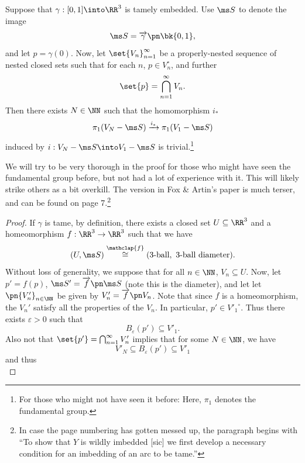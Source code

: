 \begin{example}
  \begin{theorem} \label{thm:fox-artin-tameness}
    Suppose that $\gamma : [0,1] \into \RR^3$ is tamely embedded. Use
    $\ms S$ to denote the image
    \[
      \ms S = \fim{\gamma}{\bk{0,1}},
    \]
    and let $p = \gamma(0)$. Now, let $\set{V_n}_{n =1}^\infty$ be a
    properly-nested sequence of nested closed sets such that for each
    $n$, $p \in V_n^\circ$, and further
    \[
      \set{p} = \bigcap_{n=1}^\infty V_n.%
    \]
    Then there exists $N \in \NN$ such that the homomorphism $i_*$
    \[
      \pi_1(V_N - \ms S) \xrightarrow{i_*} \pi_1(V_1 - \ms S)
    \]
    induced by $i : V_N - \ms S \into V_1 - \ms S$ is
    trivial.\footnote{For those who might not have seen it before:
      Here, $\pi_1$ denotes the fundamental group.}
  \end{theorem}
  We will try to be very thorough in the proof for those who might
  have seen the fundamental group before, but not had a lot of
  experience with it. This will likely strike others as a bit
  overkill. The version in Fox \& Artin's paper is much terser, and
  can be found on page 7.\footnote{In case the page numbering has
    gotten messed up, the paragraph begins with ``To show that $Y$ is
    wildly imbedded [sic] we first develop a necessary condition for
    an imbedding of an arc to be tame.''}
  \begin{proof}
    If $\gamma$ is tame, by definition, there exists a closed set $U
    \subseteq \RR^3$ and a homeomorphism $f : \RR^3 \to \RR^3$ such
    that we have
    \[
      (U, \ms S) \stackrel{\mathclap{f}}{\cong} (\text{3-ball},\
      \text{3-ball diameter}).
    \]
    Without loss of generality, we suppose that for all $n \in \NN$,
    $V_n \subseteq U$. Now, let $p' = f(p)$, $\ms S' = \fim{f}{\ms S}$
    (note this is the diameter), and let let $\pn{V_n'}_{n \in \NN}$
    be given by $V_n' = \fim{f}{V_n}$. Note that since $f$ is a
    homeomorphism, the $V_n'$ satisfy all the properties of the $V_n$.
    In particular, $p' \in {V'_1}^\circ$. Thus there exists
    $\varepsilon > 0$ such that
    \[
      B_\varepsilon(p') \subseteq V'_1.
    \]
    Also not that $\set{p'} = \bigcap_{n=1}^\infty V'_n$ implies that
    for some $N \in \NN$, we have
    \[
      V'_N \subseteq B_\varepsilon(p') \subseteq V'_1
    \]
    and thus
    \begin{equation}\label{eq:three-nested-subsets}

\end{equation}
\end{proof}
\end{example}
